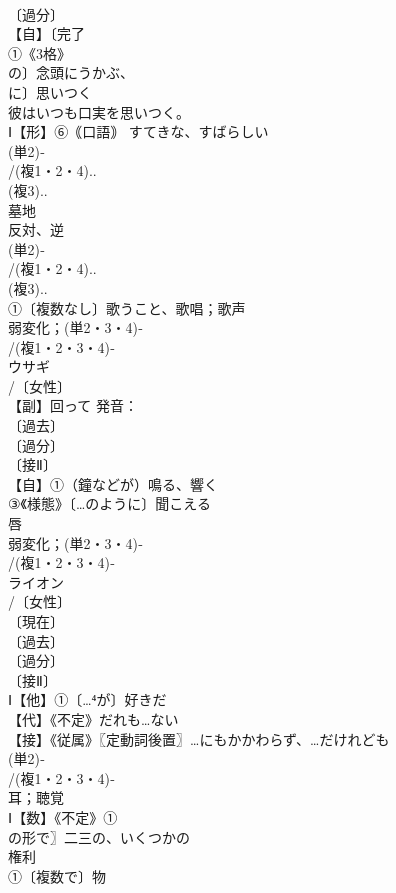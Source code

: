 \documentclass[8pt]{extreport}
\begin{document}
\begin{CJK}{UTF8}{min}
\\	〔過分〕
\\	【自】〔完了
\\	①《3格》
\\	の〕念頭にうかぶ、
\\	に〕思いつく 
\\	彼はいつも口実を思いつく。
\\	Ⅰ【形】⑥｟口語｠ すてきな、すばらしい
\\	(単2)‐
\\	/(複1・2・4)..
\\	(複3)..
\\	墓地
\\	反対、逆 
\\	(単2)‐
\\	/(複1・2・4)..
\\	(複3)..
\\	①〔複数なし〕歌うこと、歌唱；歌声
\\	弱変化；(単2・3・4)‐
\\	/(複1・2・3・4)‐
\\	ウサギ 
\\	/〔女性〕
\\	【副】回って 発音：
\\	〔過去〕
\\	〔過分〕
\\	〔接Ⅱ〕
\\	【自】①（鐘などが）鳴る、響く 
\\	③《様態》〔…のように〕聞こえる
\\	唇 
\\	弱変化；(単2・3・4)‐
\\	/(複1・2・3・4)‐
\\	ライオン 
\\	/〔女性〕
\\	〔現在〕
\\	〔過去〕
\\	〔過分〕
\\	〔接Ⅱ〕
\\	Ⅰ【他】①〔…⁴が〕好きだ
\\	【代】《不定》だれも…ない 
\\	【接】《従属》〖定動詞後置〗…にもかかわらず、…だけれども 
\\	(単2)‐
\\	/(複1・2・3・4)‐
\\	耳；聴覚 
\\	Ⅰ【数】《不定》①
\\	の形で〗二三の、いくつかの 
\\	権利 
\\	①〔複数で〕物 

\end{CJK}
\end{document}
